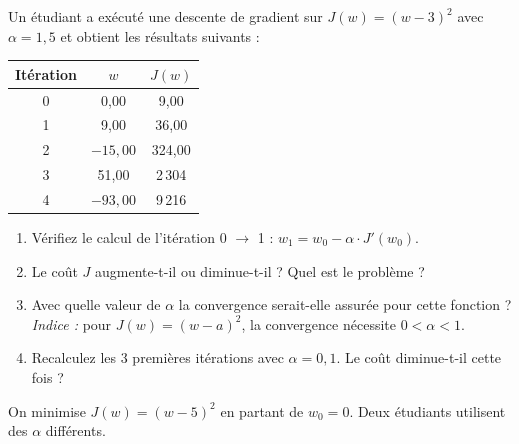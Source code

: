 
Un \'{e}tudiant a ex\'{e}cut\'{e} une descente de gradient sur $J(w) = (w - 3)^2$ avec $\alpha = 1{,}5$
et obtient les r\'{e}sultats suivants :

\begin{center}
\renewcommand{\arraystretch}{1.2}
\begin{tabular}{c|c|c}
    \toprule
    It\'{e}ration & $w$ & $J(w)$ \\
    \midrule
    0 & 0{,}00  & 9{,}00 \\
    1 & 9{,}00  & 36{,}00 \\
    2 & $-15{,}00$ & 324{,}00 \\
    3 & 51{,}00  & 2\,304 \\
    4 & $-93{,}00$ & 9\,216 \\
    \bottomrule
\end{tabular}
\end{center}

\begin{enumerate}[label=\alph*)]
    \item V\'{e}rifiez le calcul de l'it\'{e}ration 0 $\to$ 1 :
        $w_1 = w_0 - \alpha \cdot J'(w_0)$.

    \item Le co\^{u}t $J$ augmente-t-il ou diminue-t-il ? Quel est le probl\`{e}me ?

    \item Avec quelle valeur de $\alpha$ la convergence serait-elle assur\'{e}e pour
        cette fonction ? \emph{Indice :} pour $J(w) = (w-a)^2$, la convergence
        n\'{e}cessite $0 < \alpha < 1$.

    \item Recalculez les 3 premi\`{e}res it\'{e}rations avec $\alpha = 0{,}1$.
        Le co\^{u}t diminue-t-il cette fois ?
\end{enumerate}


On minimise $J(w) = (w - 5)^2$ en partant de $w_0 = 0$.
Deux \'{e}tudiants utilisent des $\alpha$ diff\'{e}rents.


